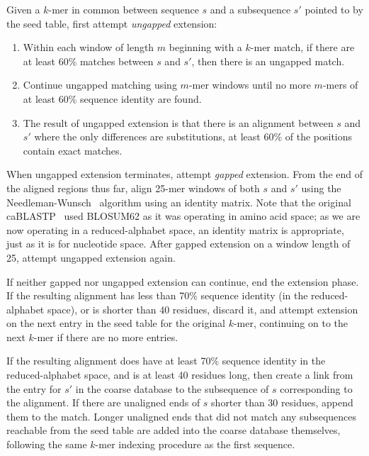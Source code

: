 \documentclass[review,preprint,12pt]{elsarticle}
\renewcommand{\cite}{\citep} %
\theoremstyle{definition}
\theoremstyle{remark}
\begin{document}
Given a $k$-mer in common between sequence $s$ and a subsequence $s'$ pointed to by the
seed table, first attempt \textit{ungapped} extension:
\begin{enumerate}
        \item Within each window of length $m$ beginning with a $k$-mer match, 
        if there are at least 60\% matches between $s$ and $s'$, then there is 
        an ungapped match.
        \item Continue ungapped matching using $m$-mer windows until no more
        $m$-mers of at least 60\% sequence identity are found.
        \item The result of ungapped extension is that there is an alignment 
        between $s$ and $s'$ where the only differences are substitutions,
        at least 60\% of the positions contain exact matches.
\end{enumerate}
        
When ungapped extension terminates, attempt \textit{gapped} extension.
From the end of the aligned regions thus far, align 25-mer windows of both
$s$ and $s'$ using the Needleman-Wunsch~\cite{needleman1970general} algorithm 
using an identity matrix.
Note that the original caBLASTP~\cite{daniels2013compressive} used BLOSUM62 as 
it was
operating in amino acid space; as we are now operating in a reduced-alphabet
space, an identity matrix is appropriate, just as it is for nucleotide space.
After gapped extension on a window length of 25, attempt ungapped extension
again.

If neither gapped nor ungapped extension can continue, end the extension phase.
If the resulting alignment has less than 70\% sequence identity (in the 
reduced-alphabet space), or is shorter than 40 residues, discard it, and 
attempt extension on the next entry in the seed table for the original $k$-mer,
continuing on to the next $k$-mer if there are no more entries.

If the resulting alignment does have at least 70\% sequence identity in the
reduced-alphabet space, and is at least 40 residues long, then create a link
from the entry for $s'$ in the coarse database to the subsequence of $s$
corresponding to the alignment.
If there are unaligned ends of $s$ shorter than 30 residues, append them to the
match.
Longer unaligned ends that did not match any subsequences reachable from the
seed table are added into the coarse database themselves, following the same
$k$-mer indexing procedure as the first sequence.
\end{document}

